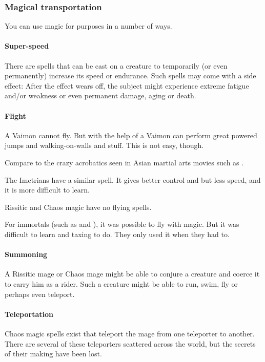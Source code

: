 \subsubsection{Magical transportation}
You can use magic for \travelling purposes in a number of ways. 



\paragraph{Super-speed}
  There are spells that can be cast on a creature to temporarily (or even permanently) increase its speed or endurance. 
  Such spells may come with a side effect: 
  After the effect wears off, the subject might experience extreme fatigue and/or weakness or even permanent damage, aging or death. 



\paragraph{Flight}
  A Vaimon cannot fly. 
  But with the help of \Atzirah a Vaimon can perform great powered jumps and walking-on-walls and stuff. 
  This is not easy, though. 
  
  Compare to the crazy acrobatics seen in Asian martial arts movies such as \cite{Movie:CrouchingTigerHiddenDragon}.
  
  The Imetrians have a similar spell. 
  It gives better control and \manoeuvrability but less speed, and it is more difficult to learn. 
  
  Rissitic and Chaos magic have no flying spells. 
  
  For immortals (such as \quiljaaran and \bezed \resphain), it was possible to fly with magic.
  But it was difficult to learn and taxing to do. 
  They only used it when they had to. 
  



\paragraph{Summoning}
  A Rissitic mage or Chaos mage might be able to conjure a creature and coerce it to carry him as a rider. 
  Such a creature might be able to run, swim, fly or perhaps even teleport. 



\paragraph{Teleportation}
  Chaos magic spells exist that teleport the mage from one teleporter to another. 
  There are several of these teleporters scattered across the world, but the secrets of their making have been lost. 





